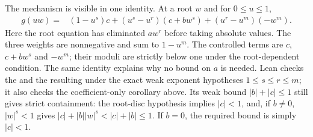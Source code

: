 The mechanism is visible in one identity.  At a root $w$ and for
$0\le u\le1$,
\[
\begin{split}
 g(uw)={}&(1-u^s)c
  +(u^s-u^r)(c+bw^s)
  +(u^r-u^m)(-w^m).
\end{split}
\]
Here the root equation has eliminated $aw^r$ before taking absolute
values. The three weights are nonnegative and sum to $1-u^m$.
The controlled terms are $c$, $c+bw^s$ and $-w^m$; their moduli are
strictly below one under the root-dependent condition. The same
identity explains why no bound on $a$ is needed.
Lean checks the 
and the resulting  under
the exact weak exponent hypotheses $1\le s\le r\le m$; it also checks the
coefficient-only corollary above. Its weak bound $|b|+|c|\le1$ still
gives strict containment: the root-disc hypothesis implies $|c|<1$,
and, if $b\ne0$, $|w|^s<1$ gives
$|c|+|b||w|^s<|c|+|b|\le1$. If $b=0$, the required bound is
simply $|c|<1$.


